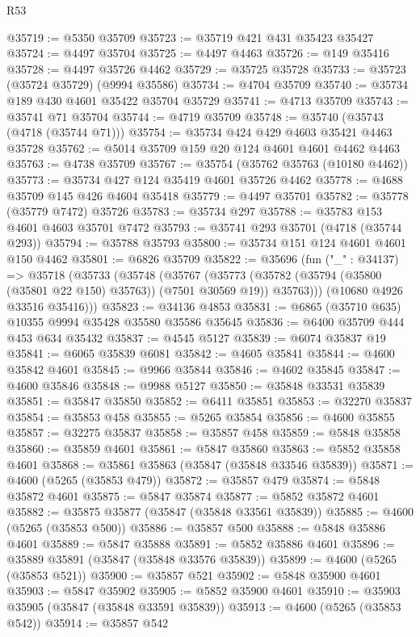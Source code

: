 \begin{lexlean}{R53}
\begin{coremodule}
@35719 := @5350 @35709
@35723 := @35719 @421 @431 @35423 @35427
@35724 := @4497 @35704
@35725 := @4497 @4463
@35726 := @149 @35416
@35728 := @4497 @35726 @4462
@35729 := @35725 @35728
@35733 := @35723 (@35724 @35729) (@9994 @35586)
@35734 := @4704 @35709
@35740 := @35734 @189 @430 @4601 @35422 @35704 @35729
@35741 := @4713 @35709
@35743 := @35741 @71 @35704
@35744 := @4719 @35709
@35748 := @35740 (@35743 (@4718 (@35744 @71)))
@35754 := @35734 @424 @429 @4603 @35421 @4463 @35728
@35762 := @5014 @35709 @159 @20 @124 @4601 @4601 @4462 @4463
@35763 := @4738 @35709
@35767 := @35754 (@35762 @35763 (@10180 @4462))
@35773 := @35734 @427 @124 @35419 @4601 @35726 @4462
@35778 := @4688 @35709 @145 @426 @4604 @35418
@35779 := @4497 @35701
@35782 := @35778 (@35779 @7472) @35726
@35783 := @35734 @297
@35788 := @35783 @153 @4601 @4603 @35701 @7472
@35793 := @35741 @293 @35701 (@4718 (@35744 @293))
@35794 := @35788 @35793
@35800 := @35734 @151 @124 @4601 @4601 @150 @4462
@35801 := @6826 @35709
@35822 := @35696
    (fun ("_" : @34137) =>
    @35718
      (@35733
        (@35748
          (@35767
            (@35773 (@35782 (@35794 (@35800 (@35801 @22 @150) @35763)) (@7501 @30569 @19)) @35763)))
        (@10680 @4926 @33516 @35416)))
@35823 := @34136 @4853
@35831 := @6865 (@35710 @635) @10355 @9994 @35428 @35580 @35586 @35645
@35836 := @6400 @35709 @444 @453 @634 @35432
@35837 := @4545 @5127
@35839 := @6074 @35837 @19
@35841 := @6065 @35839 @6081
@35842 := @4605 @35841
@35844 := @4600 @35842 @4601
@35845 := @9966 @35844
@35846 := @4602 @35845
@35847 := @4600 @35846
@35848 := @9988 @5127
@35850 := @35848 @33531 @35839
@35851 := @35847 @35850
@35852 := @6411 @35851
@35853 := @32270 @35837
@35854 := @35853 @458
@35855 := @5265 @35854
@35856 := @4600 @35855
@35857 := @32275 @35837
@35858 := @35857 @458
@35859 := @5848 @35858
@35860 := @35859 @4601
@35861 := @5847 @35860
@35863 := @5852 @35858 @4601
@35868 := @35861 @35863 (@35847 (@35848 @33546 @35839))
@35871 := @4600 (@5265 (@35853 @479))
@35872 := @35857 @479
@35874 := @5848 @35872 @4601
@35875 := @5847 @35874
@35877 := @5852 @35872 @4601
@35882 := @35875 @35877 (@35847 (@35848 @33561 @35839))
@35885 := @4600 (@5265 (@35853 @500))
@35886 := @35857 @500
@35888 := @5848 @35886 @4601
@35889 := @5847 @35888
@35891 := @5852 @35886 @4601
@35896 := @35889 @35891 (@35847 (@35848 @33576 @35839))
@35899 := @4600 (@5265 (@35853 @521))
@35900 := @35857 @521
@35902 := @5848 @35900 @4601
@35903 := @5847 @35902
@35905 := @5852 @35900 @4601
@35910 := @35903 @35905 (@35847 (@35848 @33591 @35839))
@35913 := @4600 (@5265 (@35853 @542))
@35914 := @35857 @542

\end{coremodule}
\end{lexlean}
